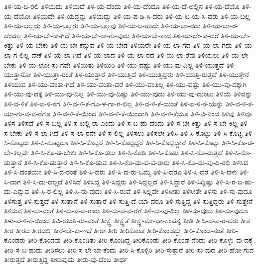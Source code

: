 {ತಿಳಿ-ಯ-ದಿ-ರಲಿ
ತಿಳಿಯದು
ತಿಳಿಯದೆ
ತಿಳಿ-ಯ-ದೆಂದು
ತಿಳಿ-ಯ-ದೆಂದೂ
ತಿಳಿ-ಯ-ದೆ-ಅಲ್ಲಿನ
ತಿಳಿ-ಯ-ದೆಯೊ
ತಿಳಿ-ಯ-ದೆಯೋ
ತಿಳಿಯದೇ
ತಿಳಿ-ಯದ್ದನ್ನು
ತಿಳಿಯದ್ದು
ತಿಳಿ-ಯ-ಪ-ಡಿ-ಸಿ-ದರು
ತಿಳಿ-ಯ-ಬ-ಯ-ಸಿ-ದರು
ತಿಳಿ-ಯ-ಬಲ್ಲ
ತಿಳಿ-ಯ-ಬಲ್ಲದು
ತಿಳಿ-ಯ-ಬಲ್ಲರು
ತಿಳಿ-ಯ-ಬಲ್ಲವು
ತಿಳಿ-ಯ-ಬ-ಹುದು
ತಿಳಿ-ಯ-ಬಾ-ರದು
ತಿಳಿ-ಯ-ಬಾ-ರ-ದೆಂದಲ್ಲ
ತಿಳಿ-ಯ-ಬೇ-ಕಾ-ಗಿದೆ
ತಿಳಿ-ಯ-ಬೇ-ಕಾ-ಗು-ವುದು
ತಿಳಿ-ಯ-ಬೇ-ಕಾದ
ತಿಳಿ-ಯ-ಬೇ-ಕಾ-ದರೆ
ತಿಳಿ-ಯ-ಬೇ-ಕಿತ್ತು
ತಿಳಿ-ಯ-ಬೇಕು
ತಿಳಿ-ಯ-ಬೇ-ಕೆನ್ನುವ
ತಿಳಿ-ಯ-ಬೇಡ
ತಿಳಿಯರೇ
ತಿಳಿ-ಯ-ಲಾ-ಗದ
ತಿಳಿ-ಯ-ಲಾ-ಗದು
ತಿಳಿ-ಯ-ಲಾ-ಗ-ಲಿಲ್ಲ-ವೇಕೆ
ತಿಳಿ-ಯ-ಲಾ-ಗಿದೆ
ತಿಳಿ-ಯ-ಲಾದ
ತಿಳಿ-ಯ-ಲಾ-ರದ
ತಿಳಿ-ಯ-ಲಾ-ರೆವು
ತಿಳಿಯಲು
ತಿಳಿ-ಯ-ಲೇ-ಬೇಕು
ತಿಳಿ-ಯ-ಲೋ-ಸು-ಗವೇ
ತಿಳಿಯಿತು
ತಿಳಿಯಿರಿ
ತಿಳಿ-ಯು-ವಷ್ಟು
ತಿಳಿ-ಯು-ವು-ದಿಲ್ಲ
ತಿಳಿ-ಯುತ್ತದೆ
ತಿಳಿ-ಯುತ್ತಾನೋ
ತಿಳಿ-ಯುತ್ತಾ-ರಂತೆ
ತಿಳಿ-ಯುತ್ತಾರೆ
ತಿಳಿ-ಯುತ್ತಿದೆ
ತಿಳಿ-ಯುತ್ತಿದ್ದರು
ತಿಳಿ-ಯುತ್ತಿ-ರುತ್ತದೆ
ತಿಳಿ-ಯುತ್ತೇನೆ
ತಿಳಿಯುವ
ತಿಳಿ-ಯು-ವಂತಾ-ಗಿದೆ
ತಿಳಿ-ಯು-ವಂತಾ-ದರೆ
ತಿಳಿ-ಯು-ವಂತಿಲ್ಲ
ತಿಳಿ-ಯು-ವಷ್ಟು
ತಿಳಿ-ಯು-ವು-ದಕ್ಕಾಗಿ
ತಿಳಿ-ಯು-ವು-ದಕ್ಕೆ
ತಿಳಿ-ಯು-ವು-ದಿಲ್ಲ
ತಿಳಿ-ಯು-ವು-ದಿಷ್ಟು
ತಿಳಿ-ಯು-ವುದು
ತಿಳಿ-ಯು-ವು-ದುಂಟು
ತಿಳಿಯೆ
ತಿಳಿವನ್ನು
ತಿಳಿ-ವ-ಳಿಕೆ
ತಿಳಿ-ವ-ಳಿ-ಕೆಗೆ
ತಿಳಿ-ವ-ಳಿ-ಕೆ-ಗೊ-ಳ-ಗಾ-ಗ-ಲಿಲ್ಲ
ತಿಳಿ-ವ-ಳಿ-ಕೆ-ಯಂತೆ
ತಿಳಿ-ವ-ಳಿ-ಕೆ-ಯನ್ನು
ತಿಳಿ-ವ-ಳಿ-ಕೆ-ಯಾ-ಗು-ವ-ವ-ರೆಗೂ
ತಿಳಿ-ವ-ಳಿ-ಕೆ-ಯಿಂದ
ತಿಳಿ-ವ-ಳಿ-ಕೆ-ಯಿಂದಾಗಿ
ತಿಳಿ-ವ-ಳಿ-ಕೆಯೂ
ತಿಳಿ-ವಿ-ನಿಂದ
ತಿಳಿವು
ತಿಳಿವೂ
ತಿಳಿಸ
ತಿಳಿಸದೆ
ತಿಳಿ-ಸ-ಬಲ್ಲ
ತಿಳಿ-ಸ-ಬಲ್ಲಿ-ರಾ-ಎಂದು
ತಿಳಿ-ಸ-ಬ-ಹು-ದೆಂದು
ತಿಳಿ-ಸ-ಬೇ-ಕಿತ್ತು
ತಿಳಿ-ಸ-ಬೇ-ಕಿಲ್ಲ
ತಿಳಿ-ಸ-ಬೇಕು
ತಿಳಿ-ಸ-ಲಾ-ಗಿದೆ
ತಿಳಿ-ಸ-ಲಾ-ರನೇ
ತಿಳಿ-ಸ-ಲಿಲ್ಲ
ತಿಳಿಸಲು
ತಿಳಿಸಲೇ
ತಿಳಿಸಿ
ತಿಳಿ-ಸಿ-ಕೊಟ್ಟು
ತಿಳಿ-ಸಿ-ಕೊಟ್ಟ
ತಿಳಿ-ಸಿ-ಕೊಟ್ಟರು
ತಿಳಿ-ಸಿ-ಕೊಟ್ಟರೂ
ತಿಳಿ-ಸಿ-ಕೊಟ್ಟರೆ
ತಿಳಿ-ಸಿ-ಕೊಟ್ಟಿದ್ದರೆ
ತಿಳಿ-ಸಿ-ಕೊಟ್ಟಿದ್ದಾರೆ
ತಿಳಿ-ಸಿ-ಕೊಟ್ಟು
ತಿಳಿ-ಸಿ-ಕೊ-ಡ-ಬೇ-ಕಲ್ಲವೇ
ತಿಳಿ-ಸಿ-ಕೊ-ಡ-ಬೇಕು
ತಿಳಿ-ಸಿ-ಕೊ-ಡಲು
ತಿಳಿ-ಸಿ-ಕೊಡಿ
ತಿಳಿ-ಸಿ-ಕೊಡು
ತಿಳಿ-ಸಿ-ಕೊ-ಡುತ್ತದೆ
ತಿಳಿ-ಸಿ-ಕೊ-ಡುತ್ತಾನೆ
ತಿಳಿ-ಸಿ-ಕೊ-ಡುತ್ತಾರೆ
ತಿಳಿ-ಸಿ-ಕೊ-ಡುವ
ತಿಳಿ-ಸಿ-ಕೊ-ಡು-ವ-ವ-ರಾರು
ತಿಳಿ-ಸಿ-ಕೊ-ಡು-ವು-ದಿ-ರಲಿ
ತಿಳಿಸಿದ
ತಿಳಿ-ಸಿ-ದಂತೆಯೇ
ತಿಳಿ-ಸಿ-ದ-ರಂತೆ
ತಿಳಿ-ಸಿ-ದರು
ತಿಳಿ-ಸಿ-ದ-ರು-ಒಮ್ಮೆ
ತಿಳಿ-ಸಿ-ದರೂ
ತಿಳಿ-ಸಿ-ದರೆ
ತಿಳಿ-ಸಿ-ದಳು
ತಿಳಿ-ಸಿ-ದಾಗ
ತಿಳಿ-ಸಿ-ದು-ದಲ್ಲದೆ
ತಿಳಿಸಿದೆ
ತಿಳಿಸಿದ್ದ
ತಿಳಿ-ಸಿದ್ದರು
ತಿಳಿ-ಸಿದ್ದಲ್ಲದೆ
ತಿಳಿ-ಸಿದ್ದಾರೆ
ತಿಳಿ-ಸಿದ್ದಿಷ್ಟು
ತಿಳಿ-ಸಿ-ರ-ಬ-ಹು-ದು-ಎನ್ನುವ
ತಿಳಿ-ಸಿ-ರ-ಲಿಲ್ಲ
ತಿಳಿ-ಸಿ-ರು-ವುದು
ತಿಳಿ-ಸಿ-ರುವೆ
ತಿಳಿ-ಸಿಲ್ಲವೇ
ತಿಳಿಸೀತು
ತಿಳಿಸೀತೇ
ತಿಳಿಸು
ತಿಳಿ-ಸು-ವುದೂ
ತಿಳಿಸುತ್ತ
ತಿಳಿ-ಸುತ್ತದೆ
ತಿಳಿ-ಸುತ್ತಾನೆ
ತಿಳಿ-ಸುತ್ತಾರೆ
ತಿಳಿ-ಸುತ್ತಿ-ದೆ-ಯಾ-ದರೂ
ತಿಳಿ-ಸುತ್ತಿದ್ದ
ತಿಳಿ-ಸುತ್ತಿದ್ದರು
ತಿಳಿ-ಸುತ್ತೇನೆ
ತಿಳಿಸುವ
ತಿಳಿ-ಸು-ವಂತೆ
ತಿಳಿ-ಸು-ವ-ವ-ರಾರು
ತಿಳಿ-ಸು-ವ-ವ-ರೆಗೆ
ತಿಳಿ-ಸು-ವು-ದಿಲ್ಲ
ತಿಳಿ-ಸು-ವುದು
ತಿಳಿ-ಸು-ವುದೂ
ತಿಳು-ವ-ಳಿ-ಕೆ-ಯಿಂದ
ತಿವಿ-ಯುತ್ತಿ-ರು-ವಂತೆ
ತೀಕ್ಷ್ಣ
ತೀಕ್ಷ್ಣತೆ
ತೀಕ್ಷ್ಣ-ಮೇ-ಧಾ-ಸಂಪನ್ನ
ತೀಡಿ
ತೀಡಿ-ದ-ವ-ರ-ವರು
ತೀತ
ತೀರ
ತೀರದ
ತೀರದಲ್ಲಿ
ತೀರ-ಬೇ-ಕು-ಇದೆ
ತೀರಾ
ತೀರಿ
ತೀರಿಕೊಂಡ
ತೀರಿ-ಕೊಂಡದ್ದು
ತೀರಿ-ಕೊಂಡ-ನಂತೆ
ತೀರಿ-ಕೊಂಡರು
ತೀರಿ-ಕೊಂಡವು
ತೀರಿ-ಕೊಂಡಿತು
ತೀರಿ-ಕೊಂಡಿದ್ದ
ತೀರಿಕೊಂಡು
ತೀರಿ-ಕೊಂಡೆ-ನೆಂದು
ತೀರಿ-ಕೊಳ್ಳು-ವು-ದಕ್ಕೆ
ತೀರಿ-ಸ-ಬ-ಹುದು
ತೀರಿಸಲು
ತೀರಿ-ಸ-ಲೇ-ಬೇ-ಕೆಂದು
ತೀರಿ-ಸಿ-ಕೊಳ್ಳಿರಿ
ತೀರಿ-ಸುತ್ತಾರೆ
ತೀರಿ-ಸು-ವುದ
ತೀರಿ-ಹೋ-ಗುವ
ತೀರುತ್ತದೆ
ತೀರುತ್ತಿದ್ದ
ತೀರುವುದು
ತೀರು-ವು-ದೆಂಬ
ತೀರ್ಥ
}
